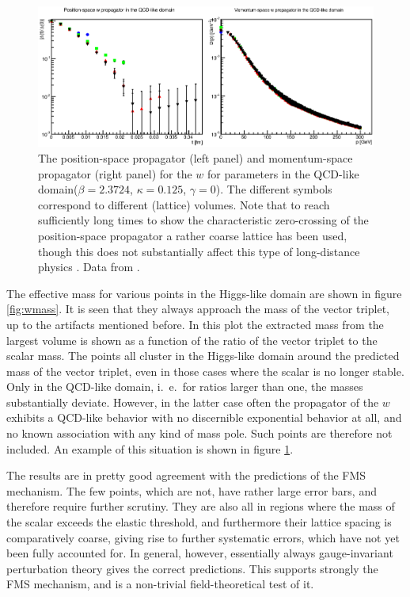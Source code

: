 \documentclass[final,12pt,3p,longtitle]{elsarticle}
\newcommand*{\1}{1\!\!\!\bot}
\begin{document}
\begin{figure}
\includegraphics[width=\linewidth]{w-qcd}
\caption{\label{fig:w-qcd}The position-space propagator (left panel) and momentum-space propagator (right panel) for the $w$ for parameters in the QCD-like domain($\beta=2.3724$, $\kappa=0.125$, $\gamma=0$). The different symbols correspond to different (lattice) volumes. Note that to reach sufficiently long times to show the characteristic zero-crossing of the position-space propagator a rather coarse lattice has been used, though this does not substantially affect this type of long-distance physics \cite{Maas:2011se}. Data from \cite{Maas:unpublished}.}
\end{figure}

The effective mass for various points in the Higgs-like domain are shown in figure \ref{fig:wmass}. It is seen that they always approach the mass of the vector triplet, up to the artifacts mentioned before. In this plot the extracted mass from the largest volume is shown as a function of the ratio of the vector triplet to the scalar mass. The points all cluster in the Higgs-like domain around the predicted mass of the vector triplet, even in those cases where the scalar is no longer stable. Only in the QCD-like domain, i.\ e.\ for ratios larger than one, the masses substantially deviate. However, in the latter case often the propagator of the $w$ exhibits a QCD-like behavior \cite{Maas:2011se} with no discernible exponential behavior at all, and no known association with any kind of mass pole. Such points are therefore not included. An example of this situation is shown in figure \ref{fig:w-qcd}.

The results are in pretty good agreement with the predictions of the FMS mechanism. The few points, which are not, have rather large error bars, and therefore require further scrutiny. They are also all in regions where the mass of the scalar exceeds the elastic threshold, and furthermore their lattice spacing is comparatively coarse, giving rise to further systematic errors, which have not yet been fully accounted for. In general, however, essentially always gauge-invariant perturbation theory gives the correct predictions. This supports strongly the FMS mechanism, and is a non-trivial field-theoretical test of it.
\end{document}
